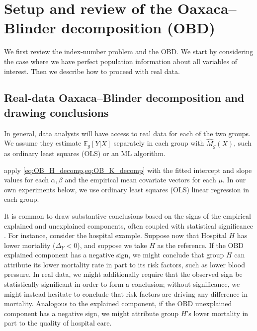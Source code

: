 \section{Setup and review of the Oaxaca--Blinder decomposition (OBD)}
\label{sec:counterfactual_OBD}

We first review the index-number problem and the OBD.
We start by considering the case where we have perfect population information about 
all variables of interest. Then we describe how to proceed with real data.





% 

\subsection{Real-data Oaxaca--Blinder decomposition and drawing conclusions} 
\label{sec:ob_real}

In general, data analysts will have access to real data for each of the two groups. 
We assume they estimate $\mathbb{E}_g[Y|X]$ separately in each group with $\hat{M}_g(X)$, such as ordinary least squares (OLS) or an ML algorithm.

apply \cref{eq:OB_H_decomp,eq:OB_K_decomp} with the fitted intercept and 
slope values for each $\alpha, \beta$ and the empirical mean covariate vectors for each $\mu$.
In our own experiments below, we use ordinary least squares (OLS) linear regression in each group.

It is common to draw substantive conclusions based on the signs of the empirical explained and unexplained components, often coupled with
statistical significance \citep{oaxacaRansom1998, jann2008,fortinLemieuxFirpo2011}. For instance, consider the hospital example. 
Suppose now that Hospital $H$ has lower mortality ($\Delta_Y < 0$), and suppose we take $H$ as the reference. 
If the OBD explained component has a negative sign, we might conclude that group $H$ can attribute
its lower mortality rate in part to its risk factors, such as lower blood pressure. In real data, we might additionally require that the observed sign be statistically significant in order to form a conclusion;
without significance, we might
instead hesitate to conclude that risk factors are driving any difference in mortality.
Analogous to the explained component, if the OBD unexplained component has a negative sign, we might attribute group $H$'s lower
mortality in part to the quality of hospital care.
